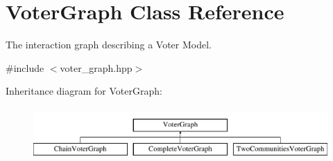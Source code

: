 \hypertarget{class_voter_graph}{\section{Voter\-Graph Class Reference}
\label{class_voter_graph}
}


The interaction graph describing a Voter Model.  




{\ttfamily \#include $<$voter\-\_\-graph.\-hpp$>$}

Inheritance diagram for Voter\-Graph\-:\begin{figure}[H]
\begin{center}
\leavevmode
\includegraphics[height=2.000000cm]{class_voter_graph}
\end{center}
\end{figure}
